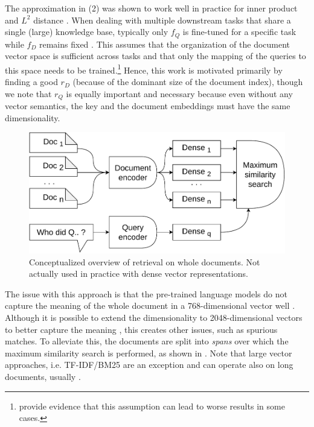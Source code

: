 The approximation in (2) was shown to work well in practice for inner product and $L^2$ distance \citep{lin2021proposed}.
When dealing with multiple downstream tasks that share a single (large) knowledge base, typically only $f_Q$ is fine-tuned for a specific task while $f_D$ remains fixed \citep{lewis2020retrieval,petroni2021kilt}.
This assumes that the organization of the document vector space is sufficient across tasks and that only the mapping of the queries to this space needs to be trained.\footnote{\citet{guu2020realm} provide evidence that this assumption can lead to worse results in some cases.}
Hence, this work is motivated primarily by finding a good $r_D$ (because of the dominant size of the document index), though we note that $r_Q$ is equally important and necessary because even without any vector semantics, the key and the document embeddings must have the same dimensionality.

\begin{figure}[ht]
    \center
    \includegraphics[width=0.7\linewidth]{img/split_concept_1.pdf}

    \caption{Conceptualized overview of retrieval on whole documents. Not actually used in practice with dense vector representations.}
    \label{fig:split_concept_1}
\end{figure}

The issue with this approach is that the pre-trained language models do not capture the meaning of the whole document in a 768-dimensional vector well \citep{reimers2019sentence,beltagy2020longformer}.
Although it is possible to extend the dimensionality to 2048-dimensional vectors to better capture the meaning \citep{beltagy2020longformer,appalaraju2021docformer}, this creates other issues, such as spurious matches.
To alleviate this, the documents are split into \emph{spans} over which the maximum similarity search is performed, as shown in .
Note that large vector approaches, i.e. TF-IDF/BM25 are an exception and can operate also on long documents, usually \citep{lv2011documents}.

